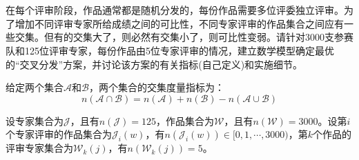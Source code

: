 \documentclass[12pt, onecolumn]{article}
\title{\normf{基于连续时间的LiDAR/Camera/IMU的时空标定方法}}
\author{\normf{陈烁龙}}
\date{\normf{\today}}
\newcommand\normf{\fangsong}
\begin{document}
	
	\maketitle
	\thispagestyle{empty}
	\clearpage
	
	\tableofcontents
	\newpage
	\listoffigures
	\newpage
	\listoftables
	
	\clearpage
	\setcounter{page}{1}
	
	\section{\normf{交叉分配}}
	\normf
	在每个评审阶段，作品通常都是随机分发的，每份作品需要多位评委独立评审。为了增加不同评审专家所给成绩之间的可比性，不同专家评审的作品集合之间应有一些交集。但有的交集大了，则必然有交集小了，则可比性变弱。请针对3000支参赛队和125位评审专家，每份作品由5位专家评审的情况，建立数学模型确定最优的“交叉分发”方案，并讨论该方案的有关指标(自己定义)和实施细节。
	
	给定两个集合$\mathcal{A}$和$\mathcal{B}$，两个集合的交集度量指标为：
	\begin{equation*}
	n\left( \mathcal{A}\cap\mathcal{B}\right) =n\left(\mathcal{A} \right)+ n\left(\mathcal{B} \right)-n\left( \mathcal{A}\cup\mathcal{B}\right)
	\end{equation*}
	
	设专家集合为$\mathcal{J}$，且有$n(\mathcal{J})=125$，作品集合为$\mathcal{W}$，且有$n(\mathcal{W})=3000$。设第$i$个专家评审的作品集合为$\mathcal{J}_i(w)$，有$n(\mathcal{J}_i(w))\in[0,1,\cdots,3000)$，第$k$个作品的评审专家集合为$\mathcal{W}_k(j)$，有$n(\mathcal{W}_k(j))=5$。
	
\end{document}
